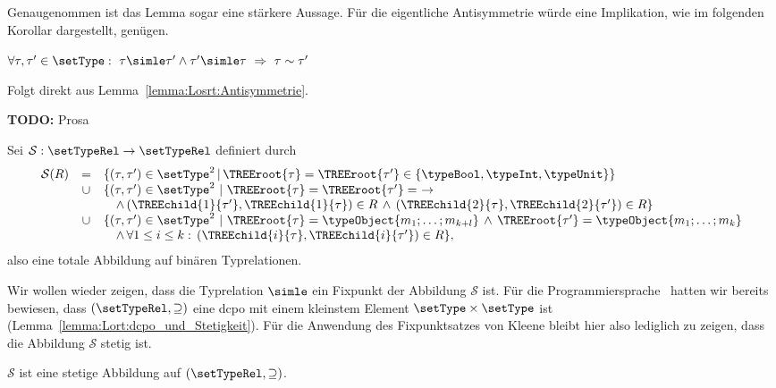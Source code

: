 %
Genaugenommen ist das Lemma sogar eine st\"arkere Aussage. F\"ur die eigentliche Antisymmetrie w\"urde eine
Implikation, wie im folgenden Korollar dargestellt, gen\"ugen.

\begin{korollar}
  $\forall \tau,\tau'\in\setType:\ \tau \simle \tau' \wedge \tau' \simle \tau\ \Rightarrow\ \tau\sim\tau'$
\end{korollar}

\begin{beweis}
  Folgt direkt aus Lemma~\ref{lemma:Losrt:Antisymmetrie}.
\end{beweis}

{\bf TODO:} Prosa

\begin{definition} \label{definition:Losrt:Abbildung_S}
  Sei $\mathcal{S}: \setTypeRel \to \setTypeRel$ definiert durch
  \[\begin{array}{rcl}
    \mathcal{S}(R)
    &   =  & \{(\tau,\tau')\in\setType^2\,|\,\TREEroot{\tau}=\TREEroot{\tau'}\in\{\typeBool,\typeInt,\typeUnit\}\} \\
    & \cup & \{(\tau,\tau')\in\setType^2\ |\ \TREEroot{\tau} = \TREEroot{\tau'} =\ \to \\
    &      & \quad \wedge\,(\TREEchild{1}{\tau'},\TREEchild{1}{\tau})\in R
                 \,\wedge\,(\TREEchild{2}{\tau},\TREEchild{2}{\tau'})\in R\} \\
    & \cup & \{(\tau,\tau')\in\setType^2\ |\ \TREEroot{\tau} = \typeObject{m_1;\ldots;m_{k+l}}
                                   \,\wedge\,\TREEroot{\tau'} = \typeObject{m_1;\ldots;m_k} \\
    &      & \quad \wedge\,\forall 1 \le i \le k:\,(\TREEchild{i}{\tau},\TREEchild{i}{\tau'})\in R\},
  \end{array}\]
  also eine totale Abbildung auf bin\"aren Typrelationen.
\end{definition}

Wir wollen wieder zeigen, dass die Typrelation $\simle$ ein Fixpunkt der Abbildung $\mathcal{S}$ ist. F\"ur die
Programmiersprache \Lort\ hatten wir bereits bewiesen, dass $(\setTypeRel,\supseteq)$ eine dcpo mit einem kleinstem
Element $\setType\times\setType$ ist (Lemma~\ref{lemma:Lort:dcpo_und_Stetigkeit}). F\"ur die Anwendung des Fixpunktsatzes
von Kleene bleibt hier also lediglich zu zeigen, dass die Abbildung $\mathcal{S}$ stetig ist.

\begin{lemma} \label{lemma:Losrt:Stetigkeit}
  $\mathcal{S}$ ist eine stetige Abbildung auf $(\setTypeRel,\supseteq)$.
\end{lemma}

